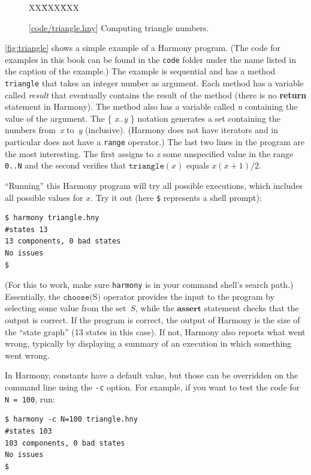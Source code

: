 \documentclass{report}
\newcommand{\harmonysource}[1]{
\begin{tabbing}
XX\=XXX\=XXX\kill
    
\end{tabbing}
}
\newcommand{\harmonylink}[1]{%
[\href{https://harmony.cs.cornell.edu/#1}{\underline{#1}}]%
}
\newenvironment{code}{
\tcolorbox
}{
\endtcolorbox
}
\begin{document}
\begin{figure}
\begin{code}
\harmonysource{triangle}
\end{code}
\caption{\harmonylink{code/triangle.hny} Computing triangle numbers.}
\label{fig:triangle}
\end{figure}

\autoref{fig:triangle} shows a simple example of a Harmony program.
(The code for examples in this book can be found in the \texttt{code} folder under
the name listed in the caption of the example.)
The example is sequential and has a method \texttt{triangle} that takes
an integer number as argument.  Each method has a variable called
\textit{result} that eventually contains the result of the
method (there is no \textbf{return} statement in Harmony).  The method
also has a variable called \textit{n} containing the value of the
argument.  The \{ \textit{x..y} \} notation generates a set containing the numbers
from~\textit{x} to~\textit{y} (inclusive).
(Harmony does not have iterators and in particular does
not have a \texttt{range} operator.)
The last two lines in the program are
the most interesting.
The first assigns to \textit{x} some unspecified value in the range \texttt{0..N}
and the second verifies that $\mathtt{triangle}(x)$ equals $x(x+1)/2$.

``Running'' this Harmony program will try all possible executions, which
includes all possible values for $x$.  Try it out (here \texttt{\$}
represents a shell prompt):

\begin{code}
\begin{verbatim}
$ harmony triangle.hny
#states 13
13 components, 0 bad states
No issues
$
\end{verbatim}
\end{code}

(For this to work, make sure \texttt{harmony} is in your command shell's search path.)
Essentially, the $\texttt{choose}($S$)$
%
operator provides the input to the program by selecting some value from the
set~$S$, while the $\textbf{assert}$ statement checks that the output is
correct.  If the program is correct, the output of Harmony is the size of the
``state graph'' (13 states in this case).  If not, Harmony also
reports what went wrong, typically by displaying a summary of an execution in
which something went wrong.

In Harmony, constants have a default value,
but those can be overridden on the command
line using the \texttt{-c} option.
%
For example, if you want to test the code for \texttt{N = 100}, run:
\begin{code}
\begin{verbatim}
$ harmony -c N=100 triangle.hny
#states 103
103 components, 0 bad states
No issues
$
\end{verbatim}
\end{code}
\end{document}
